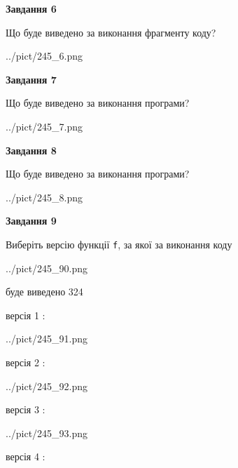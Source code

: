 \documentclass[12pt, ukrainian]{article}
\def\code#1{\Verb!#1!}
\begin{document}
{\begin {large}
{\begin {center}\textbf{Завдання 6}\end {center}}

Що буде виведено за виконання фрагменту коду?\par
\begin{center}
	{../pict/245_6.png}
\end{center}
\newpage

{\begin {center}\textbf{Завдання 7}\end {center}}

Що буде виведено за виконання програми?\par
\begin{center}
	{../pict/245_7.png}
\end{center}
\newpage

{\begin {center}\textbf{Завдання 8}\end {center}}

Що буде виведено за виконання програми?\par
\begin{center}
	{../pict/245_8.png}
\end{center}
\newpage

{\begin {center}\textbf{Завдання 9}\end {center}}

Виберіть версію функції \code{f}, за якої за виконання коду
\begin{center}
	{../pict/245_90.png}
\end{center}
буде виведено 324

\vspace{5mm}
версія 1 :

\begin{center}
	{../pict/245_91.png}
\end{center}
версія 2 :

\begin{center}
	{../pict/245_92.png}
\end{center}
версія 3 :

\begin{center}
	{../pict/245_93.png}
\end{center}
версія 4 :


\end{large}}
\end{document}
